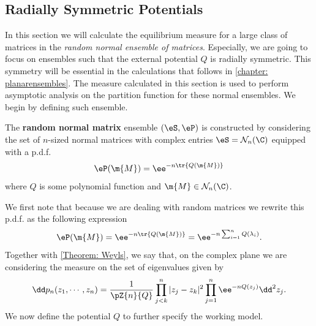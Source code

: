 \subsection{Radially Symmetric Potentials}
\label{section: Planar Ensembles}

In this section we will calculate the equilibrium measure for a large class of matrices in the \textit{random normal ensemble of matrices}. Especially, we are going to focus on ensembles such that the external potential $Q$ is radially symmetric. This symmetry will be essential in the calculations that follows in \autoref{chapter: planarensembles}. The measure calculated in this section is used to perform asymptotic analysis on the partition function for these normal ensembles. We begin by defining such ensemble. 

\begin{definicao}
	The \textbf{random normal matrix} ensemble $(\eS, \eP)$ is constructed by considering the set of $n$-sized normal matrices with complex entries $\eS = \mathcal{N}_n(\C)$ equipped with a p.d.f. 
	\begin{equation}
		\eP(\m{M}) = \ee^{-n \tr{Q(\m{M})}}
	\end{equation}
	where $Q$ is some polynomial function and $\m{M} \in \mathcal{N}_n(\C)$.
\end{definicao}

We first note that because we are dealing with random matrices we rewrite this p.d.f. as the following expression
\begin{equation}
	\eP(\m{M}) = \ee^{-n \tr{Q(\m{M})}} = \ee^{-n \sum_{i=1}^n Q(\lambda_i)}.
\end{equation} 
Together with \autoref{Theorem: Weyls}, we say that, on the complex plane we are considering the measure on the set of eigenvalues given by
\begin{equation}
	\dd p_n (z_1, \cdots, z_n) = \frac{1}{\pZ{n}{Q}} \prod_{j < k}^{n} |z_j - z_k|^2 \prod_{j=1}^{n} \ee^{- n Q(z_j)} \dd^2 z_j.
	\label{Equation: Measure Normal Matrix}
\end{equation}
We now define the potential $Q$ to further specify the working model.

